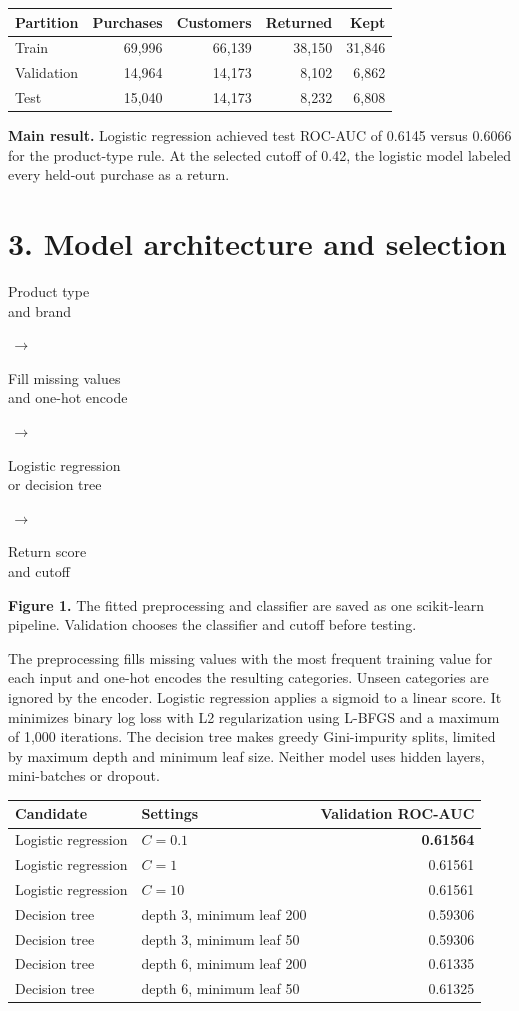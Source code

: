 \documentclass[11pt,a4paper]{article}
\newcommand{\stage}[1]{\colorbox{wash}{\parbox[c][14mm][c]{.20\linewidth}{\centering\small #1}}}
\begin{document}
\begin{center}
\begin{tabularx}{\linewidth}{Xrrrr}
\toprule Partition & Purchases & Customers & Returned & Kept\\ \midrule
Train & 69,996 & 66,139 & 38,150 & 31,846\\
Validation & 14,964 & 14,173 & 8,102 & 6,862\\
Test & 15,040 & 14,173 & 8,232 & 6,808\\ \bottomrule
\end{tabularx}
\end{center}

\textbf{Main result.} Logistic regression achieved test ROC-AUC of 0.6145 versus 0.6066 for the product-type rule. At the selected cutoff of 0.42, the logistic model labeled every held-out purchase as a return.

\newpage
\section*{3. Model architecture and selection}
\begin{center}
\stage{Product type\\and brand}\(\,\to\,\)\stage{Fill missing values\\and one-hot encode}\(\,\to\,\)\stage{Logistic regression\\or decision tree}\(\,\to\,\)\stage{Return score\\and cutoff}
\end{center}
{\small\textbf{Figure 1.} The fitted preprocessing and classifier are saved as one scikit-learn pipeline. Validation chooses the classifier and cutoff before testing.}

The preprocessing fills missing values with the most frequent training value for each input and one-hot encodes the resulting categories. Unseen categories are ignored by the encoder. Logistic regression applies a sigmoid to a linear score. It minimizes binary log loss with L2 regularization using L-BFGS and a maximum of 1,000 iterations. The decision tree makes greedy Gini-impurity splits, limited by maximum depth and minimum leaf size. Neither model uses hidden layers, mini-batches or dropout.

\begin{center}
\begin{tabularx}{\linewidth}{Xlr}
\toprule Candidate & Settings & Validation ROC-AUC\\ \midrule
Logistic regression & \(C=0.1\) & \textbf{0.61564}\\
Logistic regression & \(C=1\) & 0.61561\\
Logistic regression & \(C=10\) & 0.61561\\
Decision tree & depth 3, minimum leaf 200 & 0.59306\\
Decision tree & depth 3, minimum leaf 50 & 0.59306\\
Decision tree & depth 6, minimum leaf 200 & 0.61335\\
Decision tree & depth 6, minimum leaf 50 & 0.61325\\ \bottomrule
\end{tabularx}
\end{center}
\end{document}

